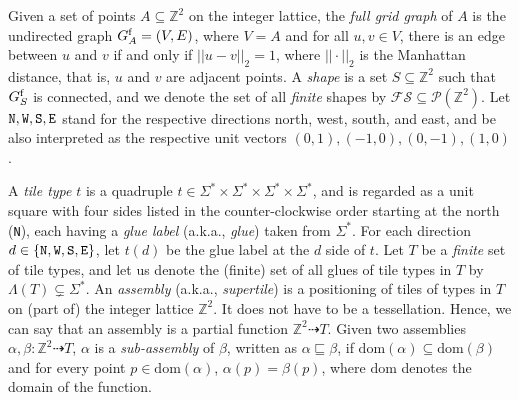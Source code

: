 \documentclass{article}
\theoremstyle{remark}
\theoremstyle{definition}
\newcommand{\north}{{\tt N}}
\newcommand{\west}{{\tt W}}
\newcommand{\south}{{\tt S}}
\newcommand{\east}{{\tt E}}
\newcommand{\dom}{\ensuremath{\mathrm{dom}}}
\begin{document}
Given a set of points $A \subseteq \mathbb{Z}^2$ on the integer lattice, the {\it full grid graph} of $A$ is the undirected graph $G^{\rm f}_A = (V, E)$, where $V = A$ and for all $u, v \in V$, there is an edge between $u$ and $v$ if and only if $||u-v||_2 = 1$, where $|| \cdot ||_2$ is the Manhattan distance, that is, $u$ and $v$ are adjacent points. 
A {\it shape} is a set $S \subseteq \mathbb{Z}^2$ such that $G^{\rm f}_S$ is connected, and we denote the set of all {\it finite} shapes by $\mathcal{FS} \subseteq \mathcal{P}(\mathbb{Z}^2)$.
Let $\north, \west, \south, \east$ stand for the respective directions north, west, south, and east, and be also interpreted as the respective unit vectors $(0, 1), (-1, 0), (0, -1), (1, 0)$. 

A {\it tile type} $t$ is a quadruple $t \in \Sigma^* \times \Sigma^* \times \Sigma^* \times \Sigma^*$, and is regarded as a unit square with four sides listed in the counter-clockwise order starting at the north (\north), each having a {\it glue label} (a.k.a., {\it glue}) taken from $\Sigma^*$. 
For each direction $d \in \{\north, \west, \south, \east\}$, let $t(d)$ be the glue label at the $d$ side of $t$. 
Let $T$ be a {\it finite} set of tile types, and let us denote the (finite) set of all glues of tile types in $T$ by $\Lambda(T) \subsetneq \Sigma^*$. 
An {\it assembly} (a.k.a., {\it supertile}) is a positioning of tiles of types in $T$ on (part of) the integer lattice $\mathbb{Z}^2$.  
It does not have to be a tessellation. 
Hence, we can say that an assembly is a partial function $\mathbb{Z}^2 \dashrightarrow T$.
Given two assemblies $\alpha, \beta: \mathbb{Z}^2 \dashrightarrow T$, $\alpha$ is a {\it sub-assembly} of $\beta$, written as $\alpha \sqsubseteq \beta$, if $\dom(\alpha) \subseteq \dom(\beta)$ and for every point $p \in \dom(\alpha)$, $\alpha(p) = \beta(p)$, where $\dom$ denotes the domain of the function. 
\end{document}

